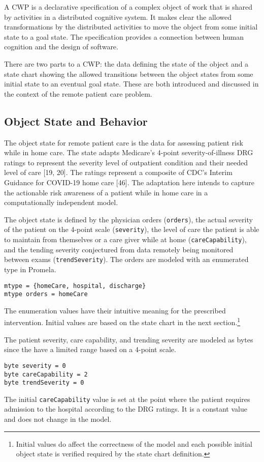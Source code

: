 A CWP is a declarative specification of a complex object of work that is shared by activities in a distributed cognitive system. It makes clear the allowed transformations by the distributed activities to move the object from some initial state to a goal state. The specification provides a connection between human cognition and the design of software.

There are two parts to a CWP: the data defining the state of the object and a state chart showing the allowed transitions between the object states from some initial state to an eventual goal state. These are both introduced and discussed in the context of the remote patient care problem. 

\subsection{Object State and Behavior}
The object state for remote patient care is the data for assessing patient risk while in home care. The state adapts Medicare’s 4-point severity-of-illness DRG ratings to represent the severity level of outpatient condition and their needed level of care [19, 20]. The ratings represent a composite of CDC’s Interim Guidance for COVID-19 home care [46]. The adaptation here intends to capture the actionable risk awareness of a patient while in home care in a computationally independent model.

The object state is defined by the physician orders (\texttt{orders}), the actual severity of the patient on the 4-point scale (\texttt{severity}), the level of care the patient is able to maintain from themselves or a care giver while at home (\texttt{careCapability}), and the tending severity conjectured from data remotely being monitored between exams (\texttt{trendSeverity}). The orders are modeled with an enumerated type in Promela.
%
{\small
\begin{lstlisting}[style=myPromela]
mtype = {homeCare, hospital, discharge}
mtype orders = homeCare
\end{lstlisting}
}
%
\noindent The enumeration values have their intuitive meaning for the prescribed intervention. Initial values are based on the state chart in the next section.\footnote{Initial values do affect the correctness of the model and each possible initial object state is verified required by the state chart definition.}

The patient severity, care capability, and trending severity are modeled as bytes since the have a limited range based on a 4-point scale.
%
{\small
\begin{lstlisting}[style=myPromela]
byte severity = 0
byte careCapability = 2
byte trendSeverity = 0
\end{lstlisting}
}
%
\noindent The initial \texttt{careCapability} value is set at the point where the patient requires admission to the hospital according to the DRG ratings. It is a constant value and does not change in the model.